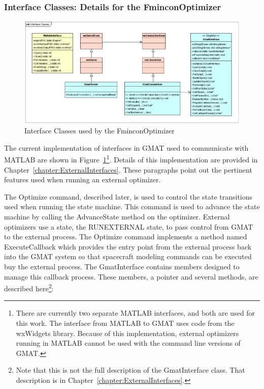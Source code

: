 \subsubsection{Interface Classes: Details for the FminconOptimizer}

\begin{figure}[htb]
\begin{center}
\includegraphics[scale=0.45]{Images/InterfaceClasses.eps}
\caption{\label{figure:InterfaceClasses}Interface Classes used by the FminconOptimizer}
\end{center}
\end{figure}

The current implementation of interfaces in GMAT used to communicate with MATLAB are shown in
Figure~\ref{figure:InterfaceClasses}\footnote{There are currently two separate MATLAB interfaces,
and both are used for this work.  The interface from MATLAB to GMAT uses code from the wxWidgets
library.  Because of this implementation, external optimizers running in MATLAB cannot be used with
the command line versions of GMAT.}.  Details of this implementation are provided in
Chapter~\ref{chapter:ExternalInterfaces}.  These paragraphs point out the pertinent features used
when running an external optimizer.

The Optimize command, described later, is used to control the state transitions used when running
the state machine.  This command is used to advance the state machine by calling the AdvanceState
method on the optimizer.  External optimizers use a state, the RUNEXTERNAL state, to pass control
from GMAT to the external process.  The Optimize command implements a method named ExecuteCallback
which provides the entry point from the external process back into the GMAT system so that
spacecraft modeling commands can be executed buy the external process.  The GmatInterface contains
members designed to manage this callback process.  These members, a pointer and several methods, are
described here\footnote{Note that this is not the full description of the GmatInterface class. That
description is in Chapter~\ref{chapter:ExternalInterfaces}.}:

